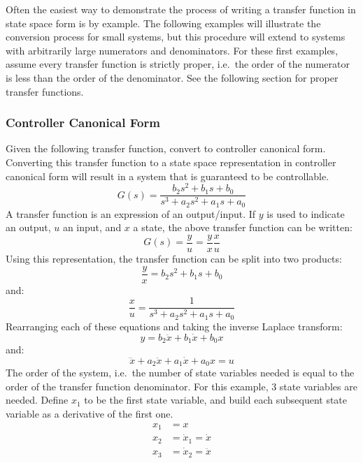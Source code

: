 Often the easiest way to demonstrate the process of writing a transfer function in state space form is by example.
The following examples will illustrate the conversion process for small systems, but this procedure will extend to systems with arbitrarily large numerators and denominators.
For these first examples, assume every transfer function is strictly proper, i.e.\ the order of the numerator is less than the order of the denominator.
See the following section for proper transfer functions.

\subsubsection{Controller Canonical Form}

Given the following transfer function, convert to controller canonical form.
Converting this transfer function to a state space representation in controller canonical form will result in a system that is guaranteed to be controllable.
\begin{equation*}
  G(s)=\frac{b_2s^2+b_1s+b_0}{s^3+a_2s^2+a_1s+a_0}
\end{equation*}
A transfer function is an expression of an output/input.
If $y$ is used to indicate an output, $u$ an input, and $x$ a state, the above transfer function can be written:
\begin{equation*}
  G(s)=\frac{y}{u}=\frac{y}{x}\frac{x}{u}
\end{equation*}
Using this representation, the transfer function can be split into two products:
\begin{equation*}
  \frac{y}{x}=b_2s^2+b_1s+b_0
\end{equation*}
and:
\begin{equation*}
  \frac{x}{u}=\frac{1}{s^3+a_2s^2+a_1s+a_0}
\end{equation*}
Rearranging each of these equations and taking the inverse Laplace transform:
\begin{equation*}
  y=b_2\ddot{x}+b_1\dot{x}+b_0x
\end{equation*}
and:
\begin{equation*}
  \dddot{x}+a_2\ddot{x}+a_1\dot{x}+a_0x=u
\end{equation*}
The order of the system, i.e.\ the number of state variables needed is equal to the order of the transfer function denominator.
For this example, 3 state variables are needed.
Define $x_1$ to be the first state variable, and build each subsequent state variable as a derivative of the first one.
\begin{equation*}
  \begin{split}
    x_1&=x \\
    x_2&=\dot{x}_1=\dot{x} \\
    x_3&=\dot{x}_2=\ddot{x}
  \end{split}
\end{equation*}
